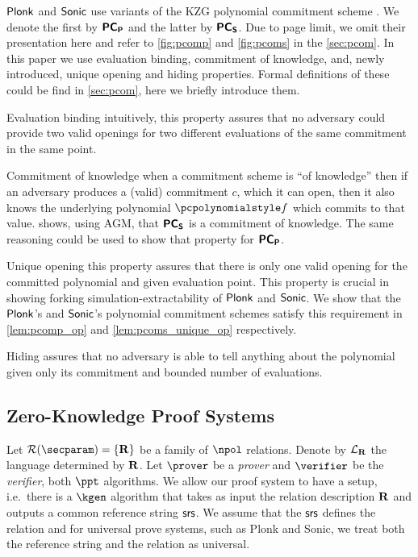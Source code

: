 $\textnormal{\textsf{Plonk}}$ and ${\textnormal{\textsf{Sonic}}}$ use variants of the KZG polynomial commitment scheme
\cite{AC:KatZavGol10}. We denote the first by $\bm{\mathsf{PC}}_{\bm{\mathsf{P}}}$ and the latter by
$\bm{\mathsf{PC}}_{\bm{\mathsf{S}}}$. Due to page limit, we omit their presentation here and refer to
\cref{fig:pcomp} and \cref{fig:pcoms} in the \cref{sec:pcom}.  In this paper we
use evaluation binding, commitment of knowledge, and, newly introduced, unique
opening and hiding properties. Formal definitions of these could be find in
\cref{sec:pcom}, here we briefly introduce them.
\begin{compactdesc}
  \item[Evaluation binding] intuitively, this property assures that no adversary
    could provide two valid openings for two different evaluations of the same
    commitment in the same point. 
  \item[Commitment of knowledge] when a commitment scheme is ``of
    knowledge'' then if an adversary produces a (valid) commitment $c$, which it
    can open, then it also knows the underlying polynomial $\p{f}$ which commits
    to that value.  \cite{CCS:MBKM19} shows, using AGM, that $\bm{\mathsf{PC}}_{\bm{\mathsf{S}}}$ is a
    commitment of knowledge.  The same reasoning could be used to show that
    property for $\bm{\mathsf{PC}}_{\bm{\mathsf{P}}}$.
  \item[Unique opening] this property assures that there is
    only one valid opening for the committed polynomial and given evaluation
    point. This property is crucial in showing forking simulation-extractability
    of $\textnormal{\textsf{Plonk}}$ and ${\textnormal{\textsf{Sonic}}}$. We show that the $\textnormal{\textsf{Plonk}}$'s and ${\textnormal{\textsf{Sonic}}}$'s
    polynomial commitment schemes satisfy this requirement in
    \cref{lem:pcomp_op} and \cref{lem:pcoms_unique_op} respectively.
  \item[Hiding] assures that no adversary is able to tell anything about the
    polynomial given only its commitment and bounded number of evaluations.
\end{compactdesc}


\subsection{Zero-Knowledge Proof Systems}
Let $\RELGEN(\secparam) = \smallset{\REL}$ be a family of
$\npol$ relations. Denote by $\mathcal{L}_{\mathbf{R}}$ the language determined by $\mathbf{R}$.
Let $\prover$ be a \emph{prover} and $\verifier$ be the \emph{verifier}, both $\ppt$ algorithms. We allow our proof system to have
a setup, i.e.~there is a $\kgen$ algorithm that takes as input the relation
description $\mathbf{R}$ and outputs a common reference string $\mathsf{srs}$. We assume that
the $\mathsf{srs}$ defines the relation and for universal prove systems, such as Plonk
and Sonic, we treat both the reference string and the relation as universal.


